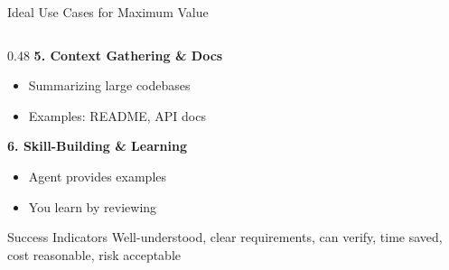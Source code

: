 \documentclass[aspectratio=169,11pt]{beamer}
\begin{document}
\begin{frame}{Ideal Use Cases for Maximum Value}
\begin{columns}[T]
\begin{column}{0.48\textwidth}
            \textbf{5. Context Gathering \& Docs}
            \begin{itemize}
                \item Summarizing large codebases
                \item Examples: README, API docs
            \end{itemize}

            \textbf{6. Skill-Building \& Learning}
            \begin{itemize}
                \item Agent provides examples
                \item You learn by reviewing
            \end{itemize}

            \begin{block}{Success Indicators}
                Well-understood, clear requirements, can verify, time saved, cost reasonable, risk acceptable
            \end{block}
        \end{column}
    \end{columns}
\end{frame}
\end{document}
